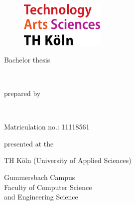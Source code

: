 \begin{titlepage}

\begin{center}

\begin{figure}[!ht]
	\includegraphics[width=1.6in]{assets/images/thLogo.pdf}\hfill
\end{figure}

\vspace{0.4cm}

\begin{LARGE}
Bachelor thesis\\
\end{LARGE}
\vspace{0.4cm}

\begin{huge}
\textbf{\thesis}\\	
\end{huge}
\vspace{0.8cm}

\begin{LARGE}
\begin{normalsize}
prepared by\\ 
\end{normalsize}
\thisauthor\\
\end{LARGE}
\small Matriculation no.: 11118561 \\
\vspace{0.8cm}

\begin{Large}
\begin{normalsize}
presented at the\\
\end{normalsize}
TH Köln (University of Applied Sciences)\\
\begin{normalsize}
Gummersbach Campus\\
Faculty of Computer Science\\
and Engineering Science\\
\end{normalsize}
\end{Large}
\vspace{0.8cm}


\end{center}
\end{titlepage}
